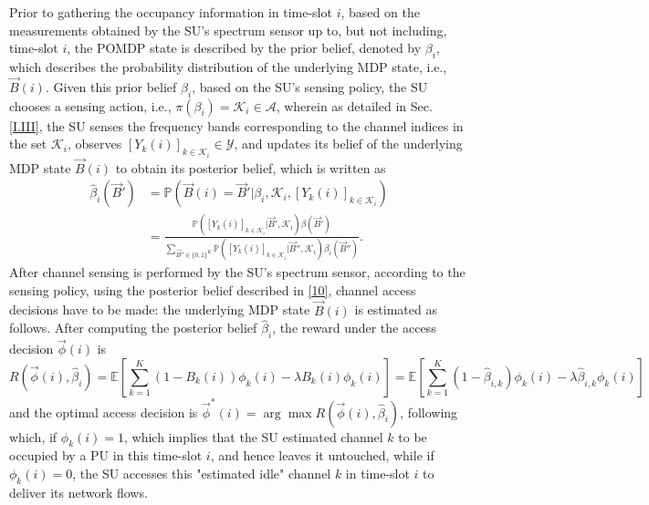 \documentclass[12pt, draftcls, onecolumn]{IEEEtran}
\begin{document}
Prior to gathering the occupancy information in time-slot $i$, based on the measurements obtained by the SU's spectrum sensor up to, but not including, time-slot $i$, the POMDP state is described by the prior belief, denoted by $\beta_{i}$, which describes the probability distribution of the underlying MDP state, i.e., $\vec{B}(i)$. Given this prior belief $\beta_{i}$, based on the SU's sensing policy, the SU chooses a sensing action, i.e., $\pi(\beta_{i})=\mathcal{K}_{i}{\in}\mathcal{A}$, wherein as detailed in Sec. \ref{I.III}, the SU senses the frequency bands corresponding to the channel indices in the set $\mathcal{K}_{i}$, observes $[Y_{k}(i)]_{k{\in}\mathcal{K}_{i}}{\in}\mathcal{Y}$, and updates its belief of the underlying MDP state $\vec{B}(i)$ to obtain its posterior belief, which is written as
\begin{equation}\label{10}
    \begin{aligned}
        \hat{\beta}_{i}(\vec{B}')&=\mathbb{P}(\vec{B}(i)=\vec{B}'|\beta_{i},\mathcal{K}_{i},[Y_{k}(i)]_{k{\in}\mathcal{K}_{i}})\\
        &=\frac{\mathbb{P}([Y_{k}(i)]_{k{\in}\mathcal{K}_{i}}|\vec{B}',\mathcal{K}_{i})\beta(\vec{B}')}{\sum_{\vec{B}'' \in \{0,1\}^{K}}\mathbb{P}([Y_{k}(i)]_{k{\in}\mathcal{K}_{i}}|\vec{B}'',\mathcal{K}_{i})\beta_{i}(\vec{B}'')}.
    \end{aligned}
\end{equation}
After channel sensing is performed by the SU's spectrum sensor, according to the sensing policy, using the posterior belief described in \eqref{10}, channel access decisions have to be made: the underlying MDP state $\vec{B}(i)$ is estimated as follows. After computing the posterior belief $\hat{\beta}_{i}$, the reward under the access decision $\vec{\phi}(i)$ is
\begin{equation}\label{12}
    R(\vec{\phi}(i),\hat{\beta}_{i})=
    \mathbb E\left[\sum_{k=1}^{K}(1-B_{k}(i))\phi_{k}(i)-\lambda B_{k}(i)\phi_k(i)\right]
    =
    \mathbb E\left[\sum_{k=1}^{K}(1-\hat{\beta}_{i,k})\phi_{k}(i)-\lambda \hat{\beta}_{i,k}\phi_k(i)\right]
\end{equation}
and the optimal access decision is $\vec{\phi}^{*}(i)=\arg\max R(\vec{\phi}(i),\hat{\beta}_{i})$, following which, if $\phi_{k}(i){=}1$, which implies that the SU estimated channel $k$ to be occupied by a PU in this time-slot $i$, and hence leaves it untouched, while if $\phi_{k}(i){=}0$, the SU accesses this "estimated idle" channel $k$ in time-slot $i$ to deliver its network flows.
\end{document}
